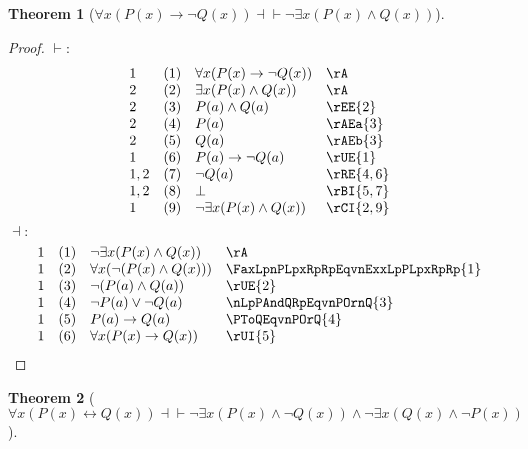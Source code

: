 \documentclass{book}
\theoremstyle{plain}
\newtheorem{theorem}{Theorem}
\theoremstyle{remark}
\theoremstyle{definition}
\begin{document}
\label{FaxLpPLpxRpTonQLpxRpRpEqvnExxLpPLpxRpAndQLpxRpRp}
\begin{theorem}[\(\forall x(P(x)\rightarrow \neg Q(x)) \dashv\vdash \neg\exists x (P(x)\land Q(x))\)]
\end{theorem}
\begin{proof}
	\(\vdash:\)
	\[
	\begin{array}{llll}
		1 & (1) & \forall x(P(x)\rightarrow \neg Q(x)) & \rA \\
		2 & (2) & \exists x(P(x)\wedge Q(x)) & \rA \\
		2 & (3) & P(a)\wedge Q(a) & \rEE{2} \\
		2 & (4) & P(a) & \rAEa{3} \\
		2 & (5) & Q(a) & \rAEb{3} \\
		1 & (6) & P(a)\rightarrow \neg Q(a) & \rUE{1} \\
		1,2 & (7) & \neg Q(a) & \rRE{4,6} \\
		1,2 & (8) & \bot & \rBI{5,7} \\
		1 & (9) & \neg\exists x(P(x)\wedge Q(x)) & \rCI{2,9} \\
	\end{array}
	\]
	\(\dashv:\)
	\[
	\begin{array}{llll}
		1 & (1) & \neg\exists x(P(x)\wedge Q(x)) & \rA \\
		1 & (2) & \forall x(\neg(P(x)\wedge Q(x))) & \FaxLpnPLpxRpRpEqvnExxLpPLpxRpRp{1} \\
		1 & (3) & \neg(P(a)\wedge Q(a)) & \rUE{2} \\
		1 & (4) & \neg P(a)\vee \neg Q(a) & \nLpPAndQRpEqvnPOrnQ{3} \\
		1 & (5) &  P(a)\rightarrow  Q(a) & \PToQEqvnPOrQ{4} \\
		1 & (6) & \forall x(P(x)\rightarrow  Q(x)) & \rUI{5} \\
	\end{array}
	\]
\end{proof}

\label{FaxLpPLpxRpLrQLpxRpRpEqvnExxLpPLpxRpAndnQLpxRpRpAndnExxLpQLpxRpAndnPLpxRpRp}
\begin{theorem}[\(\forall x(P(x)\leftrightarrow Q(x)) \dashv\vdash \neg\exists x (P(x)\land \neg Q(x))\land \neg\exists x (Q(x)\land \neg P(x))\)]
\end{theorem}
\end{document}

